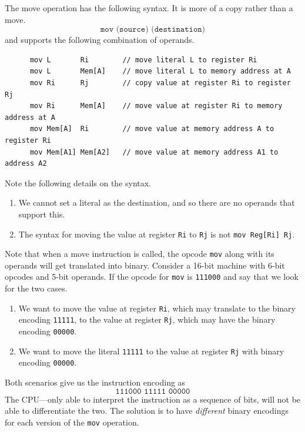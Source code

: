   \begin{definition}
    \label{def:mov}
    The move operation has the following syntax. It is more of a copy rather than a move. 
    \begin{equation}
      \texttt{mov (source) (destination)}
    \end{equation}
    and supports the following combination of operands. 
    \begin{lstlisting}
      mov L       Ri        // move literal L to register Ri
      mov L       Mem[A]    // move literal L to memory address at A
      mov Ri      Rj        // copy value at register Ri to register Rj
      mov Ri      Mem[A]    // move value at register Ri to memory address at A 
      mov Mem[A]  Ri        // move value at memory address A to register Ri 
      mov Mem[A1] Mem[A2]   // move value at memory address A1 to address A2 
    \end{lstlisting}
    Note the following details on the syntax. 
    \begin{enumerate}
      \item We cannot set a literal as the destination, and so there are no operands that support this. 
      \item The syntax for moving the value at register \texttt{Ri} to \texttt{Rj} is not \texttt{mov Reg[Ri] Rj}. 
    \end{enumerate}
  \end{definition}

  Note that when a move instruction is called, the opcode \texttt{mov} along with its operands will get translated into binary. Consider a 16-bit machine with 6-bit opcodes and 5-bit operands. If the opcode for \texttt{mov} is \texttt{111000} and say that we look for the two cases. 
  \begin{enumerate}
    \item We want to move the value at register \texttt{Ri}, which may translate to the binary encoding \texttt{11111}, to the value at register \texttt{Rj}, which may have the binary encoding \texttt{00000}. 
    \item We want to move the literal \texttt{11111} to the value at register \texttt{Rj} with binary encoding \texttt{00000}.  
  \end{enumerate}
  Both scenarios give us the instruction encoding as 
  \begin{equation}
    \texttt{111000 11111 00000}
  \end{equation}
  The CPU---only able to interpret the instruction as a sequence of bits, will not be able to differentiate the two. The solution is to have \textit{different} binary encodings for each version of the \texttt{mov} operation. 

